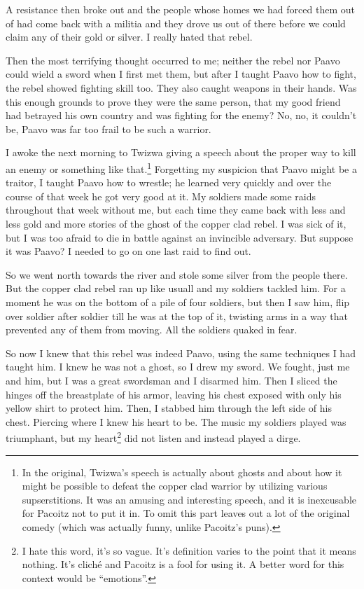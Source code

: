 A resistance then broke out and the people whose homes we had forced them out of had come back with a militia and they drove us out of there before we could claim any of their gold or silver. I really hated that rebel.

Then the most terrifying thought occurred to me; neither the rebel nor Paa\-vo could wield a sword when I first met them, but after I taught Paa\-vo how to fight, the rebel showed fighting skill too. They also caught weapons in their hands. Was this enough grounds to prove they were the same person, that my good friend had betrayed his own country and was fighting for the enemy? No, no, it couldn't be, Paa\-vo was far too frail to be such a warrior.

\tbreak

I awoke the next morning to Twi\-zwa giving a speech about the proper way to kill an enemy or something like that.\footnote{In the original, Twi\-zwa's speech is actually about ghosts and about how it might be possible to defeat the copper clad warrior by utilizing various supserstitions. It was an amusing and interesting speech, and it is inexcusable for Pa\-co\-itz not to put it in. To omit this part leaves out a lot of the original comedy (which was actually funny, unlike Pa\-co\-itz's puns).}
Forgetting my suspicion that Paa\-vo might be a traitor, I taught Paa\-vo how to wrestle; he learned very quickly and over the course of that week he got very good at it. My soldiers made some raids throughout that week without me, but each time they came back with less and less gold and more stories of the ghost of the copper clad rebel. I was sick of it, but I was too afraid to die in battle against an invincible adversary. But suppose it was Paa\-vo? I needed to go on one last raid to find out.

So we went north towards the river and stole some silver from the people there. But the copper clad rebel ran up like usuall and my soldiers tackled him. For a moment he was on the bottom of a pile of four soldiers, but then I saw him, flip over soldier after soldier till he was at the top of it, twisting arms in a way that prevented any of them from moving. All the soldiers quaked in fear.

So now I knew that this rebel was indeed Paa\-vo, using the same techniques I had taught him. I knew he was not a ghost, so I drew my sword. We fought, just me and him, but I was a great swordsman and I disarmed him. Then I sliced the hinges off the breastplate of his armor, leaving his chest exposed with only his yellow shirt to protect him. Then, I stabbed him through the left side of his chest. Piercing where I knew his heart to be. The music my soldiers played was triumphant, but my heart\footnote{I hate this word, it's so vague. It's definition varies to the point that it means nothing. It's clich\'{e} and Pa\-co\-itz is a fool for using it. A better word for this context would be ``emotions''.} did not listen and instead played a dirge. 

